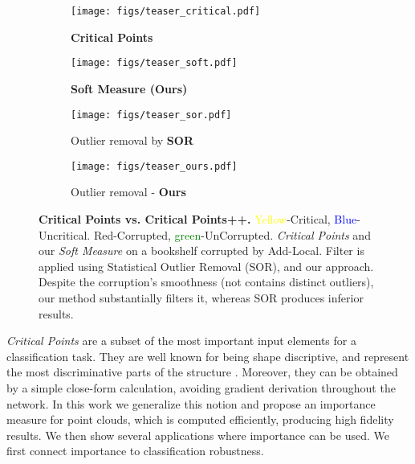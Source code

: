 \documentclass[10pt,twocolumn,letterpaper]{article}
\newcommand{\blue}[1]{\textcolor{blue}{#1}}
\newcommand{\yellow}[1]{\textcolor{yellow}{#1}}
\newcommand{\green}[1]{\textcolor{green}{#1}}
\newcommand{\red}[1]{{\color{red}#1}}
\begin{document}
\begin{figure}[ptbh!]
    \centering
    \captionsetup[subfigure]{justification=centering}
\begin{subfigure}[t]{0.24\linewidth} \texttt{[image: figs/teaser\_critical.pdf]}
\caption{{\bf  Critical Points}}
        \label{subfig:teaser_critical}
    \end{subfigure}
    \begin{subfigure}[t]{0.24\linewidth} \texttt{[image: figs/teaser\_soft.pdf]}
\caption{{\bf Soft Measure (Ours)} }    
        \label{subfig:teaser_soft}
    \end{subfigure}
    \begin{subfigure}[t]{0.24\linewidth} \texttt{[image: figs/teaser\_sor.pdf]}
\caption{Outlier removal by {\bf  SOR}}
        \label{subfig:teaser_sor}
    \end{subfigure}
    \begin{subfigure}[t]{0.20\linewidth} \texttt{[image: figs/teaser\_ours.pdf]}
\caption{Outlier removal - {\bf  Ours}}
        \label{subfig:teaser_ours}
    \end{subfigure}
    \caption{{\bf Critical Points vs. Critical Points++.} \yellow{Yellow}-Critical, \blue{Blue}-Uncritical. \red{Red}-Corrupted, \green{green}-UnCorrupted. \textit{Critical Points} and our \textit{Soft Measure} on a bookshelf corrupted by Add-Local. Filter is applied using Statistical Outlier Removal (SOR), and our approach. Despite the corruption's smoothness (not contains distinct outliers), our method substantially filters it, whereas SOR produces inferior results.}
    \label{fig:critical_points}
\end{figure}





\textit{Critical Points} \cite{pointnet} are a subset of the most important input elements for a classification task. They are well known for being shape discriptive, and represent the most discriminative parts of the structure \cite{pointnet, deep_learning_in_an_adversarial_setting, Generating_3d_adversarial_point_clouds}. Moreover, they can be obtained by a simple close-form calculation, avoiding gradient derivation throughout the network.
In this work we generalize this notion and propose an importance measure for point clouds, which is computed efficiently, producing high fidelity results. We then show several applications where importance can be used. 
We first connect importance to classification robustness.
\end{document}
